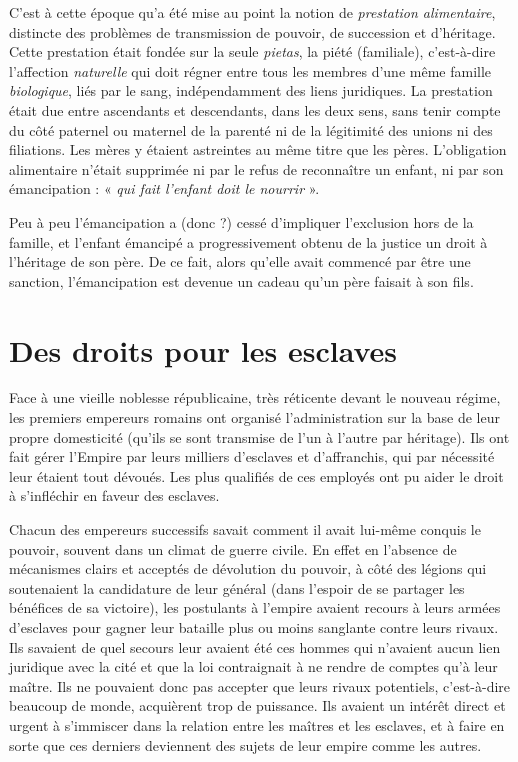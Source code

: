  C'est à cette époque qu'a été mise au point la notion de \emph{prestation alimentaire}, distincte des problèmes de transmission de pouvoir, de succession et d'héritage. Cette prestation était fondée sur la seule \emph{pietas}, la piété (familiale), c'est-à-dire l'affection \emph{naturelle} qui doit régner entre tous les membres d'une même famille \emph{biologique}, liés par le sang, indépendamment des liens juridiques. La prestation était due entre ascendants et descendants, dans les deux sens, sans tenir compte du côté paternel ou maternel de la parenté ni de la légitimité des unions ni des filiations. Les mères y étaient astreintes au même titre que les pères. L'obligation alimentaire n'était supprimée ni par le refus de reconnaître un enfant, ni par son émancipation : « \emph{qui fait l'enfant doit le nourrir} ». 

 Peu à peu l'émancipation a (donc ?) cessé d'impliquer l'exclusion hors de la famille, et l'enfant émancipé a progressivement obtenu de la justice un droit à l'héritage de son père. De ce fait, alors qu'elle avait commencé par être une sanction, l'émancipation est devenue un cadeau qu'un père faisait à son fils.

\section{Des droits pour les esclaves}

 Face à une vieille noblesse républicaine, très réticente devant le nouveau régime, les premiers empereurs romains ont organisé l'administration sur la base de leur propre domesticité (qu'ils se sont transmise de l'un à l'autre par héritage). Ils ont fait gérer l'Empire par leurs milliers d'esclaves et d'affranchis, qui par nécessité leur étaient tout dévoués. Les plus qualifiés de ces employés ont pu aider le droit à s'infléchir en faveur des esclaves. 

 Chacun des empereurs successifs savait comment il avait lui-même conquis le pouvoir, souvent dans un climat de guerre civile. En effet en l'absence de mécanismes clairs et acceptés de dévolution du pouvoir, à côté des légions qui soutenaient la candidature de leur général (dans l'espoir de se partager les bénéfices de sa victoire), les postulants à l'empire avaient recours à leurs armées d'esclaves pour gagner leur bataille plus ou moins sanglante contre leurs rivaux. Ils savaient de quel secours leur avaient été ces hommes qui n'avaient aucun lien juridique avec la cité et que la loi contraignait à ne rendre de comptes qu'à leur maître. Ils ne pouvaient donc pas accepter que leurs rivaux potentiels, c'est-à-dire beaucoup de monde, acquièrent trop de puissance. Ils avaient un intérêt direct et urgent à s'immiscer dans la relation entre les maîtres et les esclaves, et à faire en sorte que ces derniers deviennent des sujets de leur empire comme les autres. 

